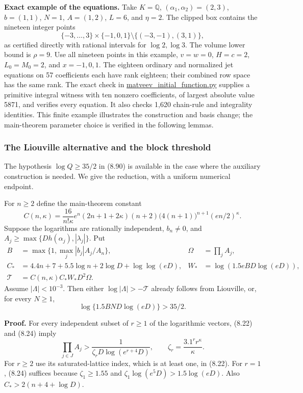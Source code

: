 \documentclass[
  11pt,
  a4paper,
]{article}
\begin{document}
\textbf{Exact example of the equations.} Take \(K=\mathbb Q\),
\((\alpha_1,\alpha_2)=(2,3)\), \(b=(1,1)\), \(N=1\), \(A=(1,2)\),
\(L=6\), and \(\eta=2\). The clipped box contains the nineteen integer
points \[
\{-3,\ldots,3\}\times\{-1,0,1\}
\setminus\{(-3,-1),(3,1)\},
\] as certified directly with rational intervals for \(\log2,\log3\).
The volume lower bound is \(\rho=9\). Use all nineteen points in this
example, \(v=w=0\), \(H=c=2\), \(L_0=M_0=2\), and \(x=-1,0,1\). The
eighteen ordinary and normalized jet equations on 57 coefficients each
have rank eighteen; their combined row space has the same rank. The
exact check in
\href{https://kokunoyumeto.github.io/open-math-courses-public/courses/TR-BAKER/verification/matveev_initial_function.py}{matveev\_initial\_function.py}
supplies a primitive integral witness with ten nonzero coefficients, of
largest absolute value 5871, and verifies every equation. It also checks
1,620 chain-rule and integrality identities. This finite example
illustrates the construction and basis change; the main-theorem
parameter choice is verified in the following lemmas.

\subsubsection{The Liouville alternative and the block
threshold}\label{the-liouville-alternative-and-the-block-threshold}

The hypothesis \(\log Q\ge35/2\) in (8.90) is available in the case
where the auxiliary construction is needed. We give the reduction, with
a uniform numerical endpoint.

For \(n\ge2\) define the main-theorem constant \[
C(n,\kappa)=
\frac{16}{n!\kappa}e^n(2n+1+2\kappa)(n+2)
\bigl(4(n+1)\bigr)^{n+1}(en/2)^\kappa.
\] Suppose the logarithms are rationally independent, \(b_n\ne0\), and
\(A_j\ge\max\{Dh(\alpha_j),|\lambda_j|\}\). Put \[
\begin{aligned}
B&=\max\{1,\max_j|b_j|A_j/A_n\},&
\Omega&=\prod_j A_j,\\
C_*&=4.4n+7+5.5\log n+2\log D+\log\log(eD),&
W_*&=\log(1.5eBD\log(eD)),\\
\mathcal T&=C(n,\kappa)C_*W_*D^2\Omega.&
\end{aligned}
\] Assume \(|\Lambda|<10^{-3}\). Then either
\(\log|\Lambda|>-\mathcal T\) already follows from Liouville, or, for
every \(N\ge1\), \[
\log\{1.5BND\log(eD)\}>35/2.
\tag{8.103}
\]

\textbf{Proof.} For every independent subset of \(r\ge1\) of the
logarithmic vectors, (8.22) and (8.24) imply \[
\prod_{j\in J}A_j>
\frac1{\zeta_rD\log(e^{r+4}D)},\qquad
\zeta_r=\frac{3.1^r r^\kappa}{\kappa}.
\] For \(r\ge2\) use its saturated-lattice index, which is at least one,
in (8.22). For \(r=1\), (8.24) suffices because \(\zeta_1\ge1.55\) and
\(\zeta_1\log(e^5D)>1.5\log(eD)\). Also \(C_*>2(n+4+\log D)\).
\end{document}
